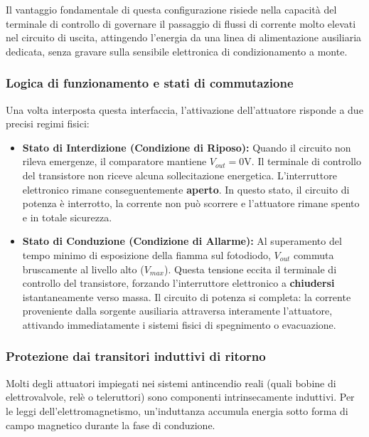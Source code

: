 \documentclass[12pt,a4paper]{article}
\begin{document}
            Il vantaggio fondamentale di questa configurazione risiede nella capacità del terminale di controllo di governare il passaggio di flussi di corrente molto elevati nel circuito di uscita, 
            attingendo l'energia da una linea di alimentazione ausiliaria dedicata, senza gravare sulla sensibile elettronica di condizionamento a monte.

        \subsubsection{Logica di funzionamento e stati di commutazione}
            Una volta interposta questa interfaccia, l'attivazione dell'attuatore risponde a due precisi regimi fisici:
            
            \begin{itemize}
                \item \textbf{Stato di Interdizione (Condizione di Riposo):} Quando il circuito non rileva emergenze, il comparatore mantiene $V_{out} = 0\text{V}$. Il terminale di controllo del transistore 
                    non riceve alcuna sollecitazione energetica. L'interruttore elettronico rimane conseguentemente \textbf{aperto}. In questo stato, il circuito di potenza è interrotto, la corrente non può 
                    scorrere e l'attuatore rimane spento e in totale sicurezza.
                \item \textbf{Stato di Conduzione (Condizione di Allarme):} Al superamento del tempo minimo di esposizione della fiamma sul fotodiodo, $V_{out}$ commuta bruscamente al livello alto ($V_{max}$). 
                    Questa tensione eccita il terminale di controllo del transistore, forzando l'interruttore elettronico a \textbf{chiudersi} istantaneamente verso massa. Il circuito di potenza si completa: 
                    la corrente proveniente dalla sorgente ausiliaria attraversa interamente l'attuatore, attivando immediatamente i sistemi fisici di spegnimento o evacuazione.
            \end{itemize}

        \subsubsection{Protezione dai transitori induttivi di ritorno}
            Molti degli attuatori impiegati nei sistemi antincendio reali (quali bobine di elettrovalvole, relè o teleruttori) sono componenti intrinsecamente induttivi. Per le leggi dell'elettromagnetismo, 
            un'induttanza accumula energia sotto forma di campo magnetico durante la fase di conduzione. 
\end{document}
